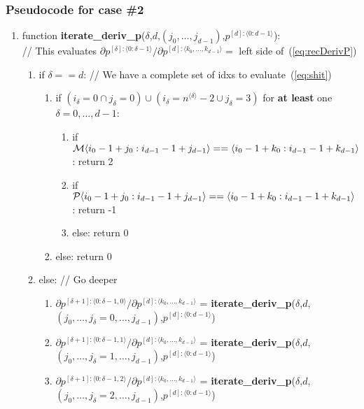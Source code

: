 \documentclass[11pt]{article}
\begin{document}

\subsubsection{Pseudocode for case \#2}


\begin{enumerate}
\item function \textbf{iterate\_deriv\_p}($\delta$,$d$,$(j_0, \dots, j_{d-1})$,$p^{[d]:\langle 0:d-1 \rangle}$): \\
// This evaluates $\partial p^{[\delta]:\langle 0: \delta -1 \rangle} / \partial p^{[d] : \langle k_0, \dots, k_{d-1} \rangle} = $ left side of~(\ref{eq:recDerivP})
\begin{enumerate}
\item if $\delta == d$: // We have a complete set of idxs to evaluate~(\ref{eq:shit})
\begin{enumerate}
\item if $(i_\delta=0 \cap j_\delta =0) \cup (i_\delta=n^{\langle \delta \rangle} -2 \cup j_\delta = 3)$ for \textbf{at least} one $\delta=0,\dots,d-1$:
\begin{enumerate}
\item if ${\cal M} \langle i_0 - 1 + j_0 : i_{d-1} - 1 + j_{d-1} \rangle == \langle i_0 - 1 + k_0 : i_{d-1} - 1 + k_{d-1} \rangle$: return 2
\item if ${\cal P} \langle i_0 - 1 + j_0 : i_{d-1} - 1 + j_{d-1} \rangle == \langle i_0 - 1 + k_0 : i_{d-1} - 1 + k_{d-1} \rangle$: return -1
\item else: return 0
\end{enumerate}
\item else: return 0
\end{enumerate}
\item else: // Go deeper
\begin{enumerate}
\item $\partial p^{[\delta+1]:\langle 0: \delta-1, 0 \rangle} / \partial p^{[d] : \langle k_0, \dots, k_{d-1} \rangle}$ = \textbf{iterate\_deriv\_p}($\delta$,$d$,$(j_0, \dots, j_\delta=0, \dots, j_{d-1})$,$p^{[d]:\langle 0:d-1 \rangle}$)
\item $\partial p^{[\delta+1]:\langle 0: \delta-1, 1 \rangle} / \partial p^{[d] : \langle k_0, \dots, k_{d-1} \rangle}$ = \textbf{iterate\_deriv\_p}($\delta$,$d$,$(j_0, \dots, j_\delta=1, \dots, j_{d-1})$,$p^{[d]:\langle 0:d-1 \rangle}$)
\item $\partial p^{[\delta+1]:\langle 0: \delta-1, 2 \rangle} / \partial p^{[d] : \langle k_0, \dots, k_{d-1} \rangle}$ = \textbf{iterate\_deriv\_p}($\delta$,$d$,$(j_0, \dots, j_\delta=2, \dots, j_{d-1})$,$p^{[d]:\langle 0:d-1 \rangle}$)

\end{enumerate}
\end{enumerate}
\end{enumerate}
\end{document}
